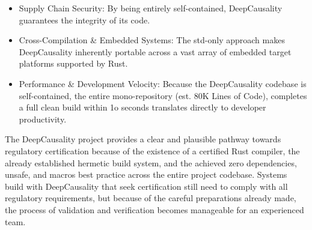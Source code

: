 \begin{itemize}
	\item Supply Chain Security: By being entirely self-contained, DeepCausality guarantees the integrity of its code. 
	\item Cross-Compilation \& Embedded Systems: The std-only approach makes DeepCausality inherently portable across a vast array of embedded target platforms supported by Rust. 
	\item Performance \& Development Velocity: Because the DeepCausality codebase is self-contained, the entire mono-repository (est. 80K Lines of Code), completes a full clean build within 1o seconds translates directly to developer productivity. 
\end{itemize}

The DeepCausality project provides a clear and plausible pathway towards regulatory certification because of the existence of a certified Rust compiler, the already established hermetic build system, and the achieved zero dependencies, unsafe, and macros best practice across the entire project codebase. Systems build with DeepCausality that seek certification still need to comply with all regulatory requirements, but because of the careful preparations already made, the process of validation and verification becomes manageable for an experienced team.


\newpage
